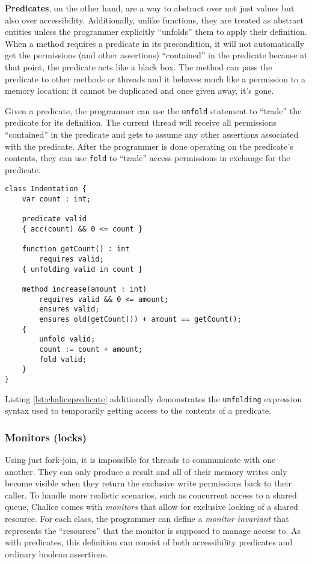 \textbf{Predicates}, on the other hand, are a way to abstract over not just values but also over accessibility. 
Additionally, unlike functions, they are treated as abstract entities unless the programmer explicitly ``unfolds'' them to apply their definition.
When a method requires a predicate in its precondition, it will not automatically get the permissions (and other assertions) ``contained'' in the predicate because at that point, the predicate acts like a black box.
The method can pass the predicate to other methods or threads and it behaves much like a permission to a memory location: it cannot be duplicated and once given away, it's gone.

Given a predicate, the programmer can use the \lstinline[language=Chalice]!unfold! statement to ``trade'' the predicate for its definition. 
The current thread will receive all permissions ``contained'' in the predicate and gets to assume any other assertions associated with the predicate.
After the programmer is done operating on the predicate's contents, they can use \lstinline[language=Chalice]!fold! to ``trade'' access permissions in exchange for the predicate.

\begin{lstlisting}[language=Chalice,float,caption={Using the predicate \lstinline!valid! to hide the representation of \lstinline!Indentation!},label={lst:chalicepredicate}]
class Indentation {
    var count : int;

    predicate valid
    { acc(count) && 0 <= count }

    function getCount() : int
        requires valid;
    { unfolding valid in count }

    method increase(amount : int)
        requires valid && 0 <= amount;
        ensures valid;
        ensures old(getCount()) + amount == getCount();
    {
        unfold valid;
        count := count + amount;
        fold valid;
    }
}
\end{lstlisting}

Listing \ref{lst:chalicepredicate} additionally demonstrates the \lstinline[language=Chalice]!unfolding! expression syntax used to temporarily getting access to the contents of a predicate.

\subsubsection{Monitors (locks)}
Using just fork-join, it is impossible for threads to communicate with one another. 
They can only produce a result and all of their memory writes only become visible when they return the exclusive write permissions back to their caller.
To handle more realistic scenarios, such as concurrent access to a shared queue, Chalice comes with \emph{monitors} that allow for exclusive locking of a shared resource.
For each class, the programmer can define a \emph{monitor invariant} that represents the ``resources'' that the monitor is supposed to manage access to. 
As with predicates, this definition can consist of both accessibility predicates and ordinary boolean assertions.

